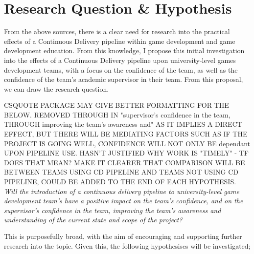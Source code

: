 \documentclass[journal]{IEEEtran}
\begin{document}

\section{Research Question \& Hypothesis}
From the above sources, there is a clear need for research into the practical effects of a Continuous Delivery pipeline within game development and game development education. From this knowledge, I propose this initial investigation into the effects of a Continuous Delivery pipeline upon university-level games development teams, with a focus on the confidence of the team, as well as the confidence of the team's academic supervisor in their team.
From this proposal, we can draw the research question.

CSQUOTE PACKAGE MAY GIVE BETTER FORMATTING FOR THE BELOW. REMOVED THROUGH IN "supervisor's confidence in the team, THROUGH improving the team's awareness and" AS IT IMPLIES A DIRECT EFFECT, BUT THERE WILL BE MEDIATING FACTORS SUCH AS IF THE PROJECT IS GOING WELL, CONFIDENCE WILL NOT ONLY BE dependant UPON PIPELINE USE. HASN'T JUSTIFIED WHY WORK IS "TIMELY" - TF DOES THAT MEAN? MAKE IT CLEARER THAT COMPARISON WILL BE BETWEEN TEAMS USING CD PIPELINE AND TEAMS NOT USING CD PIPELINE, COULD BE ADDED TO THE END OF EACH HYPOTHESIS.
\textit{Will the introduction of a continuous delivery pipeline to university-level game development team's have a positive impact on the team's confidence, and on the supervisor's confidence in the team, improving the team's awareness and understanding of the current state and scope of the project?}

This is purposefully broad, with the aim of encouraging and supporting further research into the topic. Given this, the following hypothesises will be investigated;
\end{document}
